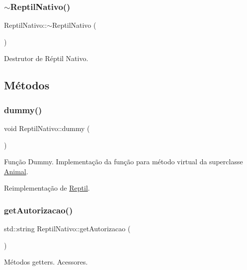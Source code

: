 \subsubsection{\texorpdfstring{$\sim$\+Reptil\+Nativo()}{~ReptilNativo()}}
{\footnotesize\ttfamily Reptil\+Nativo\+::$\sim$\+Reptil\+Nativo (\begin{DoxyParamCaption}{ }\end{DoxyParamCaption})}

Destrutor de Réptil Nativo. 

\subsection{Métodos}
\mbox{\label{classReptilNativo_a72582fd1adb5d8d562354ab35e574b3b}} 
\subsubsection{\texorpdfstring{dummy()}{dummy()}}
{\footnotesize\ttfamily void Reptil\+Nativo\+::dummy (\begin{DoxyParamCaption}{ }\end{DoxyParamCaption})\hspace{0.3cm}{\ttfamily [virtual]}}

Função Dummy. Implementação da função para método virtual da superclasse \hyperlink{classAnimal}{Animal}. 

Reimplementação de \hyperlink{classReptil_acfbb0461fc05ec7b08332dd4cee122c6}{Reptil}.

\mbox{\label{classReptilNativo_af3526f4d89e275985983ac6a76e02fc4}} 
\subsubsection{\texorpdfstring{get\+Autorizacao()}{getAutorizacao()}}
{\footnotesize\ttfamily std\+::string Reptil\+Nativo\+::get\+Autorizacao (\begin{DoxyParamCaption}{ }\end{DoxyParamCaption})}

Métodos getters. Acessores. \mbox{\label{classReptilNativo_a18648a093476229d68a57d45d749d69c}} 
